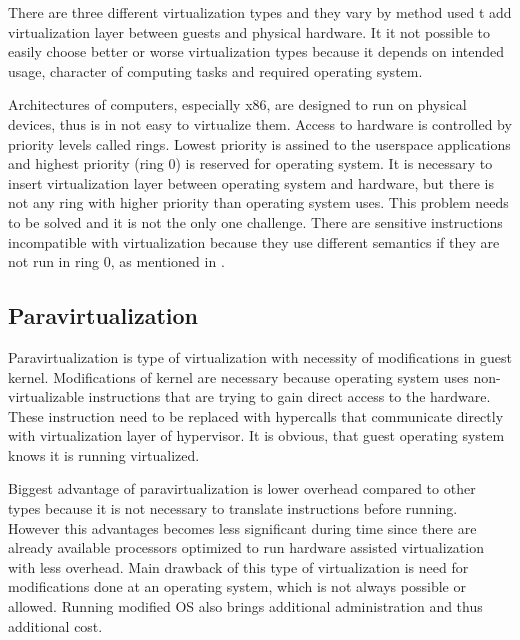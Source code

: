 
There are three different virtualization types and they vary by method used t
add virtualization layer between guests and physical hardware. It it not possible to easily choose better or worse virtualization types because it depends on intended usage, character of computing tasks and required operating system.
 
Architectures of computers, especially x86, are designed to run on physical devices, thus is in not easy to virtualize them. Access to hardware is controlled by priority levels called rings. Lowest priority is assined to the userspace applications and highest priority (ring 0) is reserved for operating system. It is necessary to insert virtualization layer between operating system and hardware, but there is not any ring with higher priority than operating system uses. This problem needs to be solved and it is not the only one challenge. There are sensitive instructions incompatible with virtualization because they use different semantics if they are not run in ring 0, as mentioned in \cite{vmware-para}.

\subsection{Paravirtualization}
Paravirtualization is type of virtualization with necessity of modifications in guest kernel. Modifications of kernel are necessary because operating system uses non-virtualizable instructions that are trying to gain direct access to the hardware. These instruction need to be replaced with hypercalls that communicate directly with virtualization layer of hypervisor. \cite{vmware-para} It is obvious, that guest operating system knows it is running virtualized. 

Biggest advantage of paravirtualization is lower overhead compared to other types because it is not necessary to translate instructions before running. However this advantages becomes less significant during time since there are already available processors optimized to run hardware assisted virtualization with less overhead. Main drawback of this type of virtualization is need for modifications done at an operating system, which is not always possible or allowed. Running modified \Ac{OS} also brings additional administration and thus additional cost.

